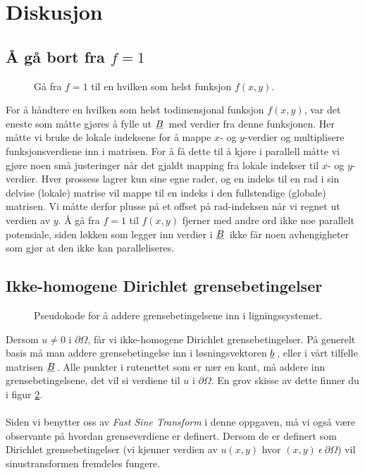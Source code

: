 \documentclass{article}
\newcommand{\ub}[1]{\underbar{$#1$}\,}
\begin{document}
\section{Diskusjon}


\subsection{Å gå bort fra $f=1$}
\begin{figure}[h]
	\centering
	
	\caption{Gå fra $f=1$ til en hvilken som helst funksjon $f(x, y)$.}
	\label{fig:local_f}
\end{figure}
For å håndtere en hvilken som helst todimensjonal funksjon $f(x, y)$, var det eneste som måtte gjøres å fylle ut $\ub{B}$ med verdier fra denne funksjonen. Her måtte vi bruke de lokale indeksene for å mappe $x$- og $y$-verdier og multiplisere funksjonsverdiene inn i matrisen. For å få dette til å kjøre i parallell måtte vi gjøre noen små justeringer når det gjaldt mapping fra lokale indekser til $x$- og $y$-verdier. Hver prossess lagrer kun sine egne rader, og en indeks til en rad i sin delvise (lokale) matrise vil mappe til en indeks i den fullstendige (globale) matrisen. Vi måtte derfor plusse på et offset på rad-indeksen når vi regnet ut verdien av $y$. Å gå fra $f=1$ til $f(x, y)$ fjerner med andre ord ikke noe parallelt potensiale, siden løkken som legger inn verdier i $\ub{B}$ ikke får noen avhengigheter som gjør at den ikke kan paralleliseres.

\subsection{Ikke-homogene Dirichlet grensebetingelser}
\begin{figure}[h]
	\centering
	
	\caption{Pseudokode for å addere grensebetingelsene inn i ligningssystemet.}
	\label{fig:non_homogenous_dirichlet}
\end{figure}
Dersom $u \neq 0$ i $\partial\Omega$, får vi ikke-homogene Dirichlet grensebetingelser. På generelt basis må man addere grensebetingelse inn i løsningsvektoren $\ub{b}$, eller i vårt tilfelle matrisen $\ub{B}$. Alle punkter i rutenettet som er nær en kant, må addere inn grensebetingelsene, det vil si verdiene til $u$ i $\partial\Omega$. En grov skisse av dette finner du i figur \ref{fig:non_homogenous_dirichlet}. \\
\\
Siden vi benytter oss av \emph{Fast Sine Transform} i denne oppgaven, må vi også være observante på hvordan grenseverdiene er definert. Dersom de er definert som Dirichlet grensebetingelser (vi kjenner verdien av $u(x, y)$ hvor $(x, y)\ \epsilon\ \partial\Omega$) vil sinustransformen fremdeles fungere.\\
\end{document}

